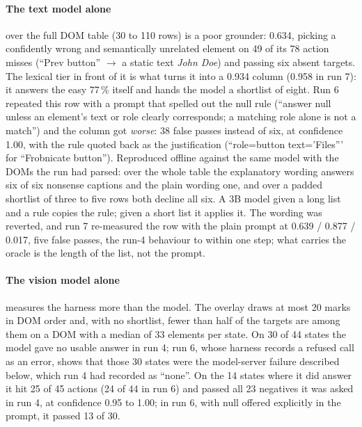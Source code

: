 \documentclass[conference]{IEEEtran}
\begin{document}
\paragraph{The text model alone} over the full DOM table (30 to 110 rows) is a poor grounder: 0.634, picking a confidently wrong and semantically unrelated element on 49 of its 78 action misses (``Prev button'' $\rightarrow$ a static text \emph{John Doe}) and passing six absent targets. The lexical tier in front of it is what turns it into a 0.934 column (0.958 in run 7): it answers the easy 77\,\% itself and hands the model a shortlist of eight. Run 6 repeated this row with a prompt that spelled out the null rule (``answer null unless an element's text or role clearly corresponds; a matching role alone is not a match'') and the column got \emph{worse}: 38 false passes instead of six, at confidence 1.00, with the rule quoted back as the justification (``role=button text='Files''' for ``Frobnicate button''). Reproduced offline against the same model with the DOMs the run had parsed: over the whole table the explanatory wording answers six of six nonsense captions and the plain wording one, and over a padded shortlist of three to five rows both decline all six. A 3B model given a long list and a rule copies the rule; given a short list it applies it. The wording was reverted, and run 7 re-measured the row with the plain prompt at 0.639 / 0.877 / 0.017, five false passes, the run-4 behaviour to within one step; what carries the oracle is the length of the list, not the prompt.

\paragraph{The vision model alone} measures the harness more than the model. The overlay draws at most 20 marks in DOM order and, with no shortlist, fewer than half of the targets are among them on a DOM with a median of 33 elements per state. On 30 of 44 states the model gave no usable answer in run 4; run 6, whose harness records a refused call as an error, shows that those 30 states were the model-server failure described below, which run 4 had recorded as ``none''. On the 14 states where it did answer it hit 25 of 45 actions (24 of 44 in run 6) and passed all 23 negatives it was asked in run 4, at confidence 0.95 to 1.00; in run 6, with null offered explicitly in the prompt, it passed 13 of 30.
\end{document}
